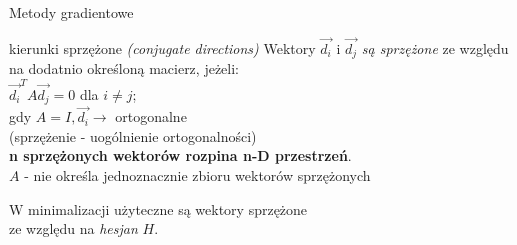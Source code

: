
  \begin{frame}{Metody gradientowe}

 	\begin{block}{kierunki sprzężone \emph{(conjugate directions)}}
 	   Wektory $\vec{d_i}$ i $\vec{d_j}$ \emph{są sprzężone} ze względu na dodatnio określoną macierz, jeżeli:
 	   \\$\vec{d_i}^T A\vec{d_j} = 0$ dla $i \neq j$;
 	   \\gdy $A = I, \vec{d_i} \rightarrow$ ortogonalne
 	   \\(sprzężenie - uogólnienie ortogonalności)
 	   \\ \textbf{n sprzężonych wektorów rozpina n-D przestrzeń}.
 	   \\$A$ - nie określa jednoznacznie zbioru wektorów sprzężonych %
 	\end{block}
W minimalizacji użyteczne są wektory sprzężone
    \\ze względu na \emph{hesjan} $H$.
  \end{frame}

